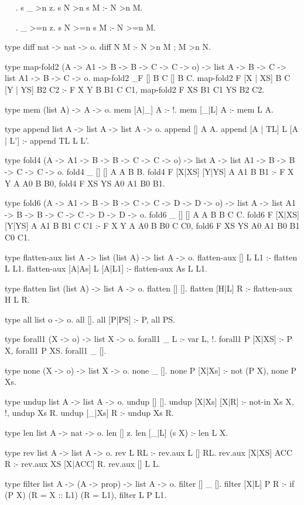 \begin{elpicode}
~  ~.
s _ >n z.
s N >n s M :- N >n M.

~  ~.
_ >=n z.
s N >=n s M :- N >=n M.

type diff nat -> nat -> o.
diff N M :- N >n M ; M >n N.

type map-fold2 (A -> A1 -> B -> B -> C -> C -> o) -> list A -> B -> C -> list A1 -> B -> C -> o.
map-fold2 _F [] B C [] B C.
map-fold2 F [X | XS] B C [Y | YS] B2 C2 :-
  F X Y B B1 C C1,
  map-fold2 F XS B1 C1 YS B2 C2.

type mem (list A) -> A -> o.
mem [A|_] A :- !.
mem [_|L] A :- mem L A.


type append list A -> list A -> list A -> o.
append [] A A.
append [A | TL] L [A | L'] :- append TL L L'.

type fold4 (A -> A1 -> B -> B -> C -> C -> o) -> list A -> list A1 -> B -> B -> C -> C -> o.
fold4 _ [] [] A A B B.
fold4 F [X|XS] [Y|YS] A A1 B B1 :- F X Y A A0 B B0, fold4 F XS YS A0 A1 B0 B1.

type fold6 (A -> A1 -> B -> B -> C -> C -> D -> D -> o) -> list A -> list A1 -> B -> B -> C -> C -> D -> D -> o.
fold6 _ [] [] A A B B C C.
fold6 F [X|XS] [Y|YS] A A1 B B1 C C1 :- F X Y A A0 B B0 C C0, fold6 F XS YS A0 A1 B0 B1 C0 C1.

type flatten-aux list A -> list (list A) -> list A -> o.
flatten-aux [] L L1 :- flatten L L1.
flatten-aux [A|As] L [A|L1] :- flatten-aux As L L1.

type flatten list (list A) -> list A -> o.
flatten [] [].
flatten [H|L] R :- flatten-aux H L R.

type all list o -> o.
all [].
all [P|PS] :- P, all PS.

type forall1 (X -> o) -> list X -> o.
forall1 _ L :- var L, !.
forall1 P [X|XS] :- P X, forall1 P XS.
forall1 _ [].

type none (X -> o) -> list X -> o.
none _ [].
none P [X|Xs] :- not (P X), none P Xs.

type undup list A -> list A -> o.
undup [] [].
undup [X|Xs] [X|R] :- not-in Xs X, !, undup Xs R.
undup [_|Xs] R :- undup Xs R.

type len list A -> nat -> o.
len [] z.
len [_|L] (s X) :- len L X.

type rev list A -> list A -> o.
rev L RL  :- rev.aux L []  RL.
rev.aux [X|XS] ACC R :- rev.aux XS [X|ACC] R.
rev.aux [] L L.

type filter list A -> (A -> prop) -> list A -> o.
filter []    _ [].
filter [X|L] P R :- if (P X) (R = X :: L1) (R = L1), filter L P L1.


\end{elpicode}
